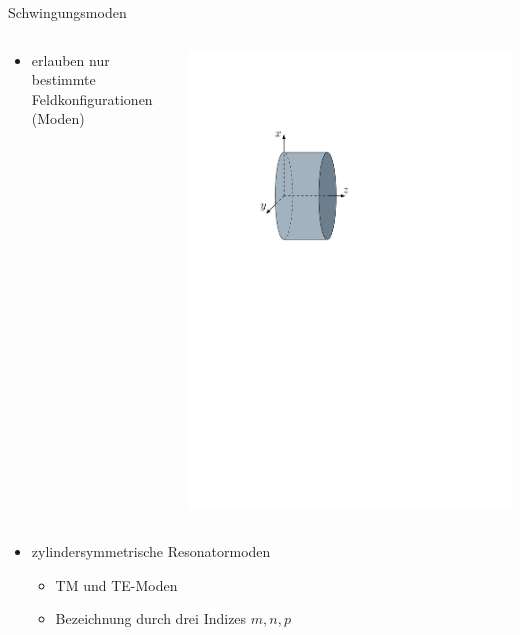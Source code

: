\documentclass[12pt,xcolor=dvipsnames,professionalfonts]{beamer}
\begin{document}
\begin{frame}{Schwingungsmoden}
\begin{columns}[T]
\begin{itemize}
\begin{itemize}
				\item erlauben nur bestimmte Feldkonfigurationen (Moden)
			\end{itemize}
		\end{itemize}
		\centering
		\includegraphics[scale=0.6]{./figures/pillbox.pdf}
	\end{columns}
	\vfill
	\begin{itemize}
		\item zylindersymmetrische Resonatormoden
		\begin{itemize}
			\setlength\itemsep{0.25em}
			\item TM und TE-Moden
			\item Bezeichnung durch drei Indizes $m, n, p$
		\end{itemize}
		
	\end{itemize}
\end{frame}
\end{document}
